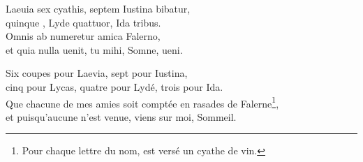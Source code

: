 \documentclass[12pt]{book} %
\begin{document}
\begin{alignment}
  \begin{edition}
    \begin{ekdverse}[type={distiques_élégiaques}]
        \begin{patverse*}
          Laeuia sex cyathis, septem Iustina bibatur, \\ 
          quinque , Lyde quattuor, Ida tribus. \\ 
          Omnis ab  numeretur amica Falerno, \\ 
          et quia nulla uenit, tu mihi, Somne, ueni.  \\
        \end{patverse*}
    \end{ekdverse}
  \end{edition}
  \begin{translation}
    \begin{ekdverse}[type={distiques_élégiaques}]
        \begin{patverse*}
          Six coupes pour Laevia, sept pour Iustina, \\ 
          cinq pour Lycas, quatre pour Lydé, trois pour Ida. \\ 
          Que chacune de mes amies soit comptée en rasades de Falerne\footnote{Pour chaque lettre du nom, est versé un cyathe de vin.}, \\
          et puisqu'aucune n'est venue, viens sur moi, Sommeil. \\
        \end{patverse*} 
    \end{ekdverse}
  \end{translation}
\end{alignment}


\begin{alignment}
  \begin{edition}
  \end{edition}
  \begin{translation}
  \end{translation}
\end{alignment}
\end{document}
